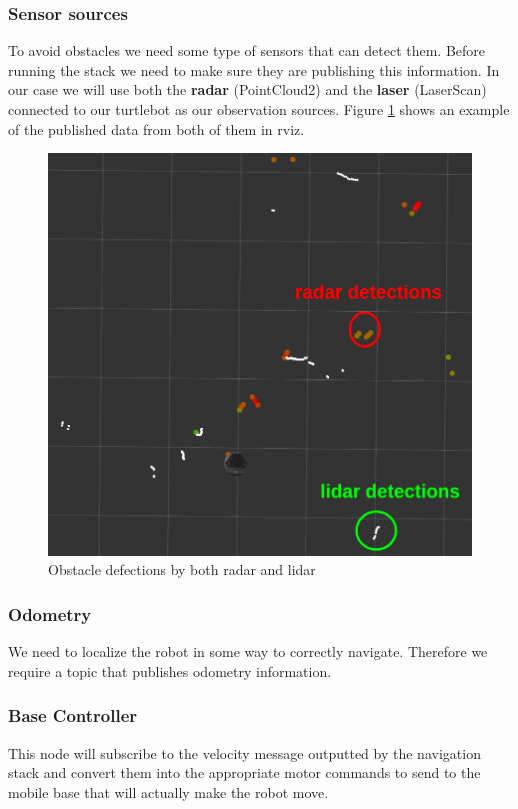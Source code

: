 \documentclass[12pt]{article}
\begin{document}
\subsubsection{Sensor sources}
To avoid obstacles we need some type of sensors that can detect them. Before running the stack we need to make sure they are publishing this information.
In our case we will use both the \textbf{radar} (PointCloud2) and the \textbf{laser} (LaserScan) connected to our turtlebot as our observation sources.
Figure \ref{fig:sensors} shows an example of the published data from both of them in rviz.
\begin{figure}[!htb]
    \centering
    \includegraphics[scale=0.2]{sensors2.png}
    \caption{Obstacle defections by both radar and lidar}
    \label{fig:sensors}
\end{figure}
\subsubsection{Odometry}
We need to localize the robot in some way to correctly navigate. Therefore we require a topic that publishes odometry information.
\subsubsection{Base Controller}
This node will subscribe to the velocity message outputted by the navigation stack and convert them into the appropriate motor commands to send to the mobile base that will actually make the robot move.
\end{document}
